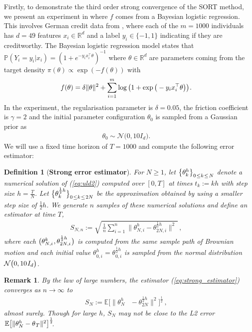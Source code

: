\documentclass[sn-mathphys-num]{sn-jnl}%
\newtheorem{remark}{Remark}%
\newtheorem{definition}{Definition}%
\newcommand{\E}{\mathbb{E}}
\newcommand{\R}{\mathbb{R}}
\newcommand{\m}{\hspace{0.25mm}}
\begin{document}
Firstly, to demonstrate the third order strong convergence of the SORT method, we present an experiment in \cite{foster2021uld, foster2024splitting} where $f$ comes from a Bayesian logistic regression.
This involves German credit data from \cite{uci}, where each of the $m=1000$ individuals has $d=49$ features $x_i\in\R^d$ and a label $y_i\in\{-1, 1\}$ indicating if they are creditworthy.
The Bayesian logistic regression model states that $\mathbb{P}(Y_i = y_i | x_i) = (1+e^{-y_i x_i^{\top} \theta})^{-1}$
where $\theta\in\R^d$ are parameters coming from the target density $\pi(\theta)\propto \exp(-f(\theta))$ with
\begin{align*}
f(\theta) = \delta\|\theta\|^2 + \sum_{i=1}^{m} \log\big(1 + \exp\big(- y_i x_i^{\top} \theta\big)\big)\m.
\end{align*}
In the experiment, the regularisation parameter is $\delta = 0.05$, the friction coefficient is $\gamma = 2$ and the initial parameter configuration $\theta_0$ is sampled from a Gaussian prior as
\begin{align*}
\theta_0\sim\mathcal{N}\big(0, 10 I_d\big).
\end{align*}
We will use a fixed time horizon of $T=1000$ and compute the following error estimator:\medbreak
\begin{definition}[\textbf{Strong error estimator}] For $N\geq 1$, let $\big\{\theta_k^h\big\}_{0\m\leq k\m\leq\m N}$ denote a numerical solution of (\ref{eq:uld2}) computed over $[0,T]$ at times $t_k := kh$ with step size $h = \frac{T}{N}$. Let $\big\{\theta_k^{\frac{1}{2}h}\big\}_{0\m\leq k\m\leq\m 2N}$ be the approximation obtained by using a smaller step size of $\frac{1}{2}h$.
We generate $n$ samples of these numerical solutions and define an estimator at time $T$,
\begin{align}\label{eq:strong_estimator}
S_{N,n} := \sqrt{\,\frac{1}{n}\sum_{i=1}^n\big\|\theta_{N, i}^h - \theta_{2N, i}^{\frac{1}{2}h}\big\|^2\,}\,,
\end{align}
where each $\big(\theta_{N, i}^k\m, \theta_{2N, i}^{\frac{1}{2}h}\m\big)$ is computed from the same sample path of Brownian motion
and each initial value $\theta_{0, i}^{h\begin{matrix}\\[-12pt]\end{matrix}} = \theta_{ 0, i}^{\frac{1}{2}h}$ is sampled from the normal distribution $\mathcal{N}\big(0, 10\m I_d\big)$.
\end{definition}\medbreak
\begin{remark}
By the law of large numbers, the estimator (\ref{eq:strong_estimator}) converges as $n\rightarrow\infty$ to
\begin{align*}
S_{N} := \E\Big[\big\|\theta_{N}^h\begin{matrix}\\[-12pt]\end{matrix} - \theta_{2N}^{\frac{1}{2}h}\big\|^2\Big]^\frac{1}{2}\,,
\end{align*}
almost surely. Though for large $h$, $S_N$ may not be close to the L2 error $\m\E\big[\|\theta_N^h - \theta_{\m T}\|^2\big]^\frac{1}{2}\hspace*{-1mm}$.	
\end{remark}\medbreak
\end{document}
